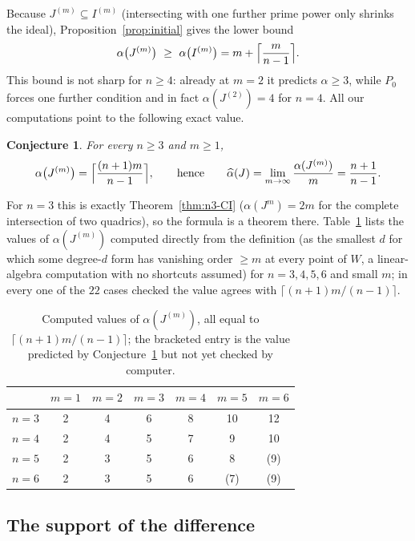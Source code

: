 \documentclass[11pt]{article}
\newtheorem{conjecture}[theorem]{Conjecture}
\newcommand{\walpha}{\widehat{\alpha}}
\begin{document}
Because \(J^{(m)}\subseteq I^{(m)}\) (intersecting with one further
prime power only shrinks the ideal), Proposition~\ref{prop:initial}
gives the lower bound
\begin{equation}\label{eq:lower-bound}
 \alpha\bigl(J^{(m)}\bigr)\ \ge\ \alpha\bigl(I^{(m)}\bigr)
 =m+\Bigl\lceil\frac m{n-1}\Bigr\rceil.
\end{equation}
This bound is not sharp for \(n\ge4\): already at \(m=2\) it predicts
\(\alpha\ge3\), while \(P_0\) forces one further condition and in fact
\(\alpha(J^{(2)})=4\) for \(n=4\).  All our computations point to the
following exact value.

\begin{conjecture}\label{conj:waldschmidt}
For every \(n\ge3\) and \(m\ge1\),
\[
 \alpha\bigl(J^{(m)}\bigr)=\Bigl\lceil\frac{(n+1)m}{n-1}\Bigr\rceil,
 \qquad\text{hence}\qquad
 \walpha(J)=\lim_{m\to\infty}\frac{\alpha(J^{(m)})}m=\frac{n+1}{n-1}.
\]
\end{conjecture}

For \(n=3\) this is exactly Theorem~\ref{thm:n3-CI} (\(\alpha(J^m)=2m\)
for the complete intersection of two quadrics), so the formula is a
theorem there. Table~\ref{tab:alpha} lists the values of
\(\alpha(J^{(m)})\) computed directly from the definition (as the
smallest \(d\) for which some degree-\(d\) form has vanishing order
\(\ge m\) at every point of \(W\), a linear-algebra computation with
no shortcuts assumed) for \(n=3,4,5,6\) and small \(m\); in every one
of the \(22\) cases checked the value agrees with
\(\lceil(n+1)m/(n-1)\rceil\).

\begin{table}[h]
\centering
\begin{tabular}{c|cccccc}
 & \(m=1\)&\(m=2\)&\(m=3\)&\(m=4\)&\(m=5\)&\(m=6\)\\\hline
\(n=3\) & 2&4&6&8&10&12\\
\(n=4\) & 2&4&5&7&9&10\\
\(n=5\) & 2&3&5&6&8&(9)\\
\(n=6\) & 2&3&5&6&(7)&(9)
\end{tabular}
\caption{Computed values of \(\alpha(J^{(m)})\), all equal to
\(\lceil(n+1)m/(n-1)\rceil\); the bracketed entry is the value
predicted by Conjecture~\ref{conj:waldschmidt} but not yet checked by
computer.}
\label{tab:alpha}
\end{table}

\subsection{The support of the difference}
\end{document}
